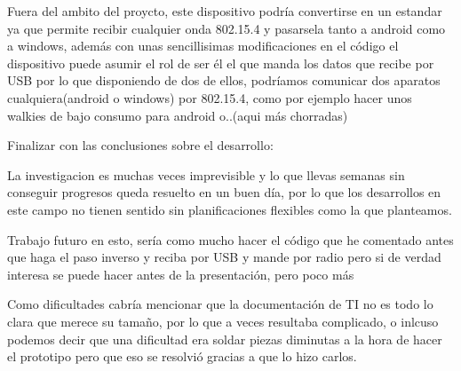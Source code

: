 		Fuera del ambito del proycto, este dispositivo podría convertirse en un estandar ya que permite recibir cualquier onda 802.15.4 y pasarsela tanto a android como a windows, además con unas sencillisimas modificaciones en el código el dispositivo puede asumir el rol de ser él el que manda los datos que recibe por USB por lo que disponiendo de dos de ellos, podríamos comunicar dos aparatos cualquiera(android o windows) por 802.15.4, como por ejemplo hacer unos walkies de bajo consumo para android o..(aqui más chorradas)

		Finalizar con las conclusiones sobre el desarrollo:

		La investigacion es muchas veces imprevisible y lo que llevas semanas sin conseguir progresos queda resuelto en un buen día, por lo que los desarrollos en este campo no tienen sentido sin planificaciones flexibles como la que planteamos. 

		Trabajo futuro en esto, sería como mucho hacer el código que he comentado antes que haga el paso inverso y reciba por USB y mande por radio pero si de verdad interesa se puede hacer antes de la presentación, pero poco más

		Como dificultades cabría mencionar que la documentación de TI no es todo lo clara que merece su tamaño, por lo que a veces resultaba complicado, o inlcuso podemos decir que una dificultad era soldar piezas diminutas a la hora de hacer el prototipo pero que eso se resolvió gracias a que lo hizo carlos.
















